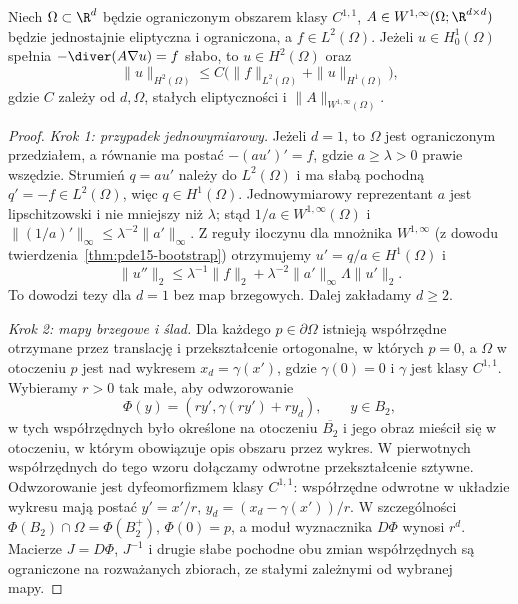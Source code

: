 \begin{twierdzenie}
\label{thm:pde15-boundary}
Niech $\Omega\subset\R^d$ będzie ograniczonym obszarem
klasy $C^{1,1}$, $A\in W^{1,\infty}(\Omega;\R^{d\times d})$
będzie jednostajnie eliptyczna i ograniczona, a
$f\in L^2(\Omega)$. Jeżeli $u\in H_0^1(\Omega)$ spełnia
$-\diver(A\nabla u)=f$ słabo, to $u\in H^2(\Omega)$ oraz
\begin{equation}\label{eq:pde15-boundary}
 \|u\|_{H^2(\Omega)}\le C\bigl(\|f\|_{L^2(\Omega)}
 +\|u\|_{H^1(\Omega)}\bigr),
\end{equation}
gdzie $C$ zależy od $d,\Omega$, stałych eliptyczności
i $\|A\|_{W^{1,\infty}(\Omega)}$.
\end{twierdzenie}
\begin{proof}
\emph{Krok 1: przypadek jednowymiarowy.}
Jeżeli $d=1$, to $\Omega$ jest ograniczonym przedziałem,
a równanie ma postać $-(au')'=f$, gdzie $a\ge\lambda>0$
prawie wszędzie. Strumień $q=au'$ należy do $L^2(\Omega)$
i ma słabą pochodną $q'=-f\in L^2(\Omega)$,
więc $q\in H^1(\Omega)$. Jednowymiarowy reprezentant
$a$ jest lipschitzowski i nie mniejszy niż $\lambda$;
stąd $1/a\in W^{1,\infty}(\Omega)$ i
$\|(1/a)'\|_\infty\le\lambda^{-2}\|a'\|_\infty$.
Z reguły iloczynu dla mnożnika $W^{1,\infty}$
(z dowodu twierdzenia~\ref{thm:pde15-bootstrap})
otrzymujemy $u'=q/a\in H^1(\Omega)$ i
\[
 \|u''\|_2\le\lambda^{-1}\|f\|_2+
 \lambda^{-2}\|a'\|_\infty\Lambda\|u'\|_2.
\]
To dowodzi tezy dla $d=1$ bez map brzegowych.
Dalej zakładamy $d\ge2$.

\emph{Krok 2: mapy brzegowe i ślad.}
Dla każdego $p\in\partial\Omega$ istnieją współrzędne
otrzymane przez translację i przekształcenie ortogonalne,
w których $p=0$, a $\Omega$ w otoczeniu $p$ jest
nad wykresem $x_d=\gamma(x')$, gdzie $\gamma(0)=0$
i $\gamma$ jest klasy $C^{1,1}$.
Wybieramy $r>0$ tak małe, aby odwzorowanie
\[
 \Phi(y)=(ry',\gamma(ry')+ry_d),\qquad y\in B_2,
\]
w tych współrzędnych było określone na otoczeniu
$\overline{B_2}$ i jego obraz mieścił się w otoczeniu,
w którym obowiązuje opis obszaru przez wykres.
W pierwotnych współrzędnych do tego wzoru dołączamy
odwrotne przekształcenie sztywne.
Odwzorowanie jest dyfeomorfizmem klasy $C^{1,1}$:
współrzędne odwrotne w układzie wykresu mają postać
$y'=x'/r$, $y_d=(x_d-\gamma(x'))/r$.
W szczególności $\Phi(B_2)\cap\Omega=\Phi(B_2^+)$,
$\Phi(0)=p$, a moduł wyznacznika $D\Phi$ wynosi $r^d$.
Macierze $J=D\Phi$, $J^{-1}$ i drugie słabe pochodne
obu zmian współrzędnych są ograniczone na rozważanych
zbiorach, ze stałymi zależnymi od wybranej mapy.


\end{proof}
